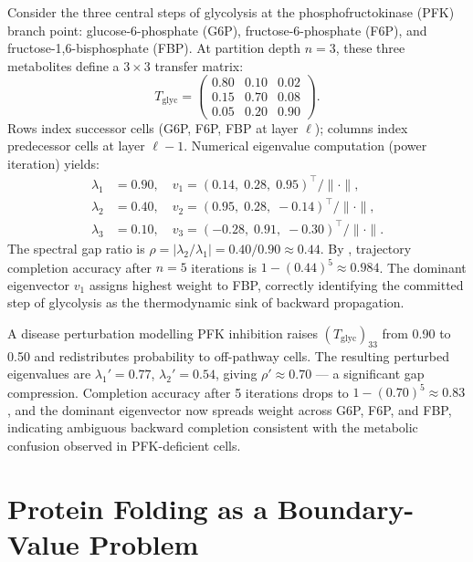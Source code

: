 \begin{example}
\label{ex:ch05-glycolysis}
Consider the three central steps of glycolysis at the
phosphofructokinase (PFK) branch point: glucose-6-phosphate (G6P),
fructose-6-phosphate (F6P), and fructose-1,6-bisphosphate (FBP).  At
partition depth $n = 3$, these three metabolites define a $3 \times 3$
transfer matrix:
\begin{equation}
\label{eq:ch05-glycolysis-T}
T_{\mathrm{glyc}} =
\begin{pmatrix}
0.80 & 0.10 & 0.02 \\
0.15 & 0.70 & 0.08 \\
0.05 & 0.20 & 0.90
\end{pmatrix}.
\end{equation}
Rows index successor cells (G6P, F6P, FBP at layer $\ell$); columns index
predecessor cells at layer $\ell - 1$.  Numerical eigenvalue computation
(power iteration) yields:
\begin{align}
\lambda_1 &= 0.90, \quad v_1 = (0.14,\; 0.28,\; 0.95)^\top / \|{\cdot}\|, \\
\lambda_2 &= 0.40, \quad v_2 = (0.95,\; 0.28,\; -0.14)^\top / \|{\cdot}\|, \\
\lambda_3 &= 0.10, \quad v_3 = (-0.28,\; 0.91,\; -0.30)^\top / \|{\cdot}\|.
\end{align}
The spectral gap ratio is $\rho = |\lambda_2/\lambda_1| = 0.40/0.90
\approx 0.44$.  By , trajectory completion accuracy
after $n = 5$ iterations is $1 - (0.44)^5 \approx 0.984$.  The dominant
eigenvector $v_1$ assigns highest weight to FBP, correctly identifying the
committed step of glycolysis as the thermodynamic sink of backward
propagation.

A disease perturbation modelling PFK inhibition raises $(T_{\mathrm{glyc}})_{33}$
from 0.90 to 0.50 and redistributes probability to off-pathway cells.  The
resulting perturbed eigenvalues are $\lambda_1' = 0.77$, $\lambda_2' = 0.54$,
giving $\rho' \approx 0.70$ --- a significant gap compression.  Completion
accuracy after 5 iterations drops to $1 - (0.70)^5 \approx 0.83$,
and the dominant eigenvector now spreads weight across G6P, F6P, and FBP,
indicating ambiguous backward completion consistent with the metabolic
confusion observed in PFK-deficient cells.
\end{example}

\section{Protein Folding as a Boundary-Value Problem}
\label{sec:ch05-protein-folding}

